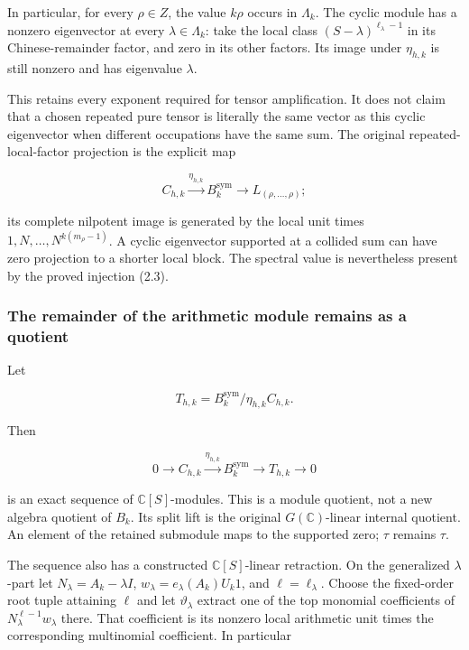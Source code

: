 \documentclass[
]{article}
\begin{document}
In particular, for every \(\rho\in Z\), the value \(k\rho\) occurs in
\(\Lambda_k\). The cyclic module has a nonzero eigenvector at every
\(\lambda\in\Lambda_k\): take the local class
\((S-\lambda)^{\ell_\lambda-1}\) in its Chinese-remainder factor, and
zero in its other factors. Its image under \(\eta_{h,k}\) is still
nonzero and has eigenvalue \(\lambda\).

This retains every exponent required for tensor amplification. It does
not claim that a chosen repeated pure tensor is literally the same
vector as this cyclic eigenvector when different occupations have the
same sum. The original repeated-local-factor projection is the explicit
map

\[C_{h,k}\xrightarrow{\eta_{h,k}}B_k^{\mathrm{sym}}
\longrightarrow L_{(\rho,\ldots,\rho)};\tag{2.4}\]

its complete nilpotent image is generated by the local unit times
\(1,N,\ldots,N^{k(m_\rho-1)}\). A cyclic eigenvector supported at a
collided sum can have zero projection to a shorter local block. The
spectral value is nevertheless present by the proved injection (2.3).

\subsubsection{The remainder of the arithmetic module remains as a
quotient}\label{the-remainder-of-the-arithmetic-module-remains-as-a-quotient}

Let

\[T_{h,k}=B_k^{\mathrm{sym}}/\eta_{h,k}C_{h,k}.\]

Then

\[\boxed{0\to C_{h,k}\xrightarrow{\eta_{h,k}}B_k^{\mathrm{sym}}\to T_{h,k}\to0}\tag{2.5}\]

is an exact sequence of \(\mathbb C[S]\)-modules. This is a module
quotient, not a new algebra quotient of \(B_k\). Its split lift is the
original \(G(\mathbb C)\)-linear internal quotient. An element of the
retained submodule maps to the supported zero; \(\tau\) remains
\(\tau\).

The sequence also has a constructed \(\mathbb C[S]\)-linear retraction.
On the generalized \(\lambda\)-part let \(N_\lambda=A_k-\lambda I\),
\(w_\lambda=e_\lambda(A_k)U_k1\), and \(\ell=\ell_\lambda\). Choose the
fixed-order root tuple attaining \(\ell\) and let \(\vartheta_\lambda\)
extract one of the top monomial coefficients of
\(N_\lambda^{\ell-1}w_\lambda\) there. That coefficient is its nonzero
local arithmetic unit times the corresponding multinomial coefficient.
In particular
\end{document}
